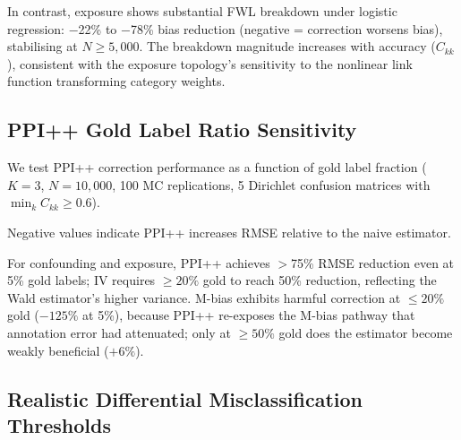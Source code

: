 In contrast, exposure shows substantial FWL breakdown under logistic regression: $-$22\% to $-$78\% bias reduction (negative = correction worsens bias), stabilising at $N \geq 5{,}000$. The breakdown magnitude increases with accuracy ($C_{kk}$), consistent with the exposure topology's sensitivity to the nonlinear link function transforming category weights.

\subsection{PPI++ Gold Label Ratio Sensitivity}
\label{sec:ppi_gold_ratio}

We test PPI++ correction performance as a function of gold label fraction ($K{=}3$, $N{=}10{,}000$, 100 MC replications, 5 Dirichlet confusion matrices with $\min_k C_{kk}{\geq}0.6$).

Negative values indicate PPI++ increases RMSE relative to the naive estimator.

\begin{table}[H]
\centering
\caption{PPI++ RMSE reduction (\%) vs.\ gold label fraction.}
\label{tab:ppi_gold_ratio}
\end{table}

For confounding and exposure, PPI++ achieves $>$75\% RMSE reduction even at 5\% gold labels; IV requires ${\geq}20\%$ gold to reach 50\% reduction, reflecting the Wald estimator's higher variance. M-bias exhibits harmful correction at ${\leq}20\%$ gold ($-125\%$ at 5\%), because PPI++ re-exposes the M-bias pathway that annotation error had attenuated; only at ${\geq}50\%$ gold does the estimator become weakly beneficial ($+6\%$).

\subsection{Realistic Differential Misclassification Thresholds}
\label{sec:realistic_epsilon}

